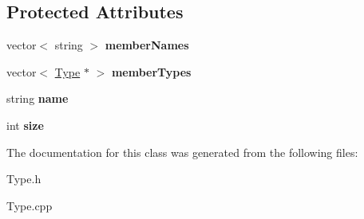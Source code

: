 \subsection*{Protected Attributes}
\begin{DoxyCompactItemize}
\item 
\hypertarget{classStructType_a05bb5f274f8d003cfc1eeadebb1427fa}{vector$<$ string $>$ {\bfseries member\-Names}}\label{classStructType_a05bb5f274f8d003cfc1eeadebb1427fa}

\item 
\hypertarget{classStructType_a1e1bcc873343ef44b531054ad464115d}{vector$<$ \hyperlink{classType}{Type} $\ast$ $>$ {\bfseries member\-Types}}\label{classStructType_a1e1bcc873343ef44b531054ad464115d}

\item 
\hypertarget{classType_ad7eeefba3dfcecbdaa98d46aaa84e389}{string {\bfseries name}}\label{classType_ad7eeefba3dfcecbdaa98d46aaa84e389}

\item 
\hypertarget{classType_a871302dc63ac1a37c0b6a225cf82048d}{int {\bfseries size}}\label{classType_a871302dc63ac1a37c0b6a225cf82048d}

\end{DoxyCompactItemize}


The documentation for this class was generated from the following files\-:\begin{DoxyCompactItemize}
\item 
Type.\-h\item 
Type.\-cpp\end{DoxyCompactItemize}
